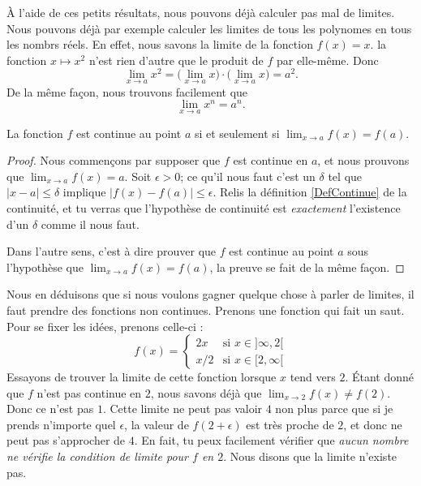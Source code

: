 À l'aide de ces petits résultats, nous pouvons déjà calculer pas mal de limites. Nous pouvons déjà par exemple calculer les limites de tous les polynomes en tous les nombrs réels. En effet, nous savons la limite de la fonction $f(x)=x$. la fonction $x\mapsto x^2$ n'est rien d'autre que le produit de $f$ par elle-même. Donc
\[ 
  \lim_{x\to a}x^2=\big( \lim_{x\to a}x\big)\cdot\big( \lim_{x\to a}x \big)=a^2.
\]
De la même façon, nous trouvons facilement que 
\begin{equation}
 \lim_{x\to a}x^n=a^n.
\end{equation}

\begin{theorem}           \label{ThoLimCont}
La fonction $f$ est continue au point $a$ si et seulement si $\lim_{x\to a}f(x)=f(a)$.
\end{theorem}

\begin{proof}
Nous commençons par supposer que $f$ est continue en $a$, et nous prouvons que $\lim_{x\to a}f(x)=a$. Soit $\epsilon>0$; ce qu'il nous faut c'est un $\delta$ tel que $| x-a |\leq\delta$ implique $| f(x)-f(a) |\leq\epsilon$. Relis la définition \ref{DefContinue} de la continuité, et tu verras que l'hypothèse de continuité est \emph{exactement} l'existence d'un $\delta$ comme il nous faut.

Dans l'autre sens, c'est à dire prouver que $f$ est continue au point $a$ sous l'hypothèse que $\lim_{x\to a}f(x)=f(a)$, la preuve se fait de la même façon.
\end{proof}

Nous en déduisons que si nous voulons gagner quelque chose à parler de limites, il faut prendre des fonctions non continues. Prenons une fonction qui fait un saut. Pour se fixer les idées, prenons celle-ci :
\begin{equation}    \label{EqnCtOEL}
f(x)=
\begin{cases}
2x&\text{si $x\in]\infty,2[$}\\
x/2&\text{si $x\in[2,\infty[$}
\end{cases}
\end{equation}  
Essayons de trouver la limite de cette fonction lorsque $x$ tend vers $2$. Étant donné que $f$ n'est pas continue en $2$, nous savons déjà que $\lim_{x\to 2}f(x)\neq f(2)$. Donc ce n'est pas $1$. Cette limite ne peut pas valoir $4$ non plus parce que si je prends n'importe quel $\epsilon$, la valeur de $f(2+\epsilon)$ est très proche de $2$, et donc ne peut pas s'approcher de $4$. En fait, tu peux facilement vérifier que \emph{aucun nombre ne vérifie la condition de limite pour $f$ en $2$}. Nous disons que la limite n'existe pas.


